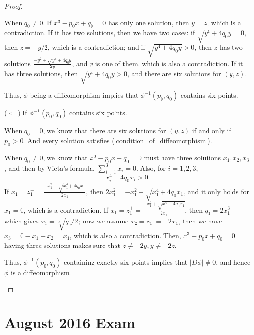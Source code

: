 \documentclass[11pt]{article}
\theoremstyle{definition}
\numberwithin{equation}{subsection}
\begin{document}
\begin{proof}
\begin{enumerate}[label=(\alph*)]
\begin{enumerate}[label=\arabic*)]
        When $q_0 \neq 0$. If $x^3 - p_0x + q_0 = 0$ has only one solution, then $y = z$, which is a contradiction. If it has two solutions, then we have two cases: if $\sqrt{y^4 + 4q_0y} = 0$, then $z = - y/2$, which is a contradiction; and if $\sqrt{y^4 + 4q_0y} > 0$, then $z$ has two solutions $\frac{-y^2 \pm \sqrt{y^4 + 4q_0y}}{2y}$, and $y$ is one of them, which is also a contradiction. If it has three solutions, then $\sqrt{y^4 + 4q_0y} > 0$, and there are six solutions for $(y,z)$.
        
        Thus, $\phi$ being a diffeomorphism implies that $\phi^{-1}(p_0, q_0)$ contains six points.
        
        ($\Leftarrow$) If $\phi^{-1}(p_0, q_0)$ contains six points.
        
        When $q_0 = 0$, we know that there are six solutions for $(y, z)$ if and only if $p_0 > 0$. And every solution satisfies (\ref{condition_of_diffeomorphism}). 
        
        When $q_0 \neq 0$, we know that $x^3 - p_0x + q_0 = 0$ must have three solutions $x_1, x_2, x_3$, and then by Vieta's formula, $\sum^3_{i=1} x_i = 0$. Also, for $i = 1,2,3$, 
        $$x_i^4 + 4 q_0 x_i > 0.$$
        If $x_1 = z_1^- = \frac{-x_1^2 - \sqrt{x_1^4 + 4q_0x_1}}{2x_1}$, then $2x_1^2 = -x_1^2 - \sqrt{x_1^4 + 4q_0x_1}$, and it only holds for $x_1 = 0$, which is a contradiction. If $x_1 = z_1^+ = \frac{-x_1^2 + \sqrt{x_1^4 + 4q_0x_1}}{2x_1}$, then $q_0 = 2x_1^3$, which gives $x_1 = \sqrt[3]{q_0/2}$; now we assume $x_2 = z_1^- = -2x_1$, then we have $x_3 = 0 - x_1 - x_2 = x_1$, which is also a contradiction. Then, $x^3 - p_0x + q_0 = 0$ having three solutions makes sure that $z \neq -2y, y \neq -2z$. 
        
        Thus, $\phi^{-1}(p_0, q_0)$ containing exactly six points implies that $|D\phi| \neq 0$, and hence $\phi$ is a diffeomorphism.
    \end{enumerate}
\end{enumerate}
\end{proof}


\newpage
\section{August 2016 Exam}
\end{document}
